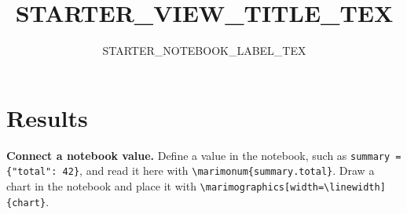 \documentclass[11pt]{article}
\title{STARTER_VIEW_TITLE_TEX}
\author{STARTER_NOTEBOOK_LABEL_TEX}
\date{}
\begin{document}
\maketitle

\section{Results}

\noindent\colorbox{black!4}{\parbox{\dimexpr\linewidth-2\fboxsep}{%
  \textbf{Connect a notebook value.} Define a value in the notebook, such as
  \texttt{summary = \{"total": 42\}}, and read it here with
  \texttt{\textbackslash marimonum\{summary.total\}}. Draw a chart in the
  notebook and place it with
  \texttt{\textbackslash marimographics[width=\textbackslash linewidth]\{chart\}}.
}}
\end{document}

